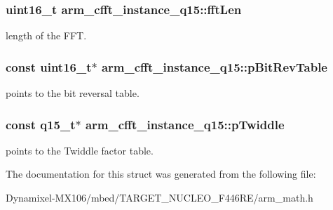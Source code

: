 \subsubsection[{\texorpdfstring{fft\+Len}{fftLen}}]{\setlength{\rightskip}{0pt plus 5cm}uint16\+\_\+t arm\+\_\+cfft\+\_\+instance\+\_\+q15\+::fft\+Len}\hypertarget{structarm__cfft__instance__q15_a5f9e1d3a8c127ee323b5e6929aeb90df}{}\label{structarm__cfft__instance__q15_a5f9e1d3a8c127ee323b5e6929aeb90df}
length of the F\+FT. 
\subsubsection[{\texorpdfstring{p\+Bit\+Rev\+Table}{pBitRevTable}}]{\setlength{\rightskip}{0pt plus 5cm}const uint16\+\_\+t$\ast$ arm\+\_\+cfft\+\_\+instance\+\_\+q15\+::p\+Bit\+Rev\+Table}\hypertarget{structarm__cfft__instance__q15_ac9160b80243b99a0b6e2f75ddb5cf0ae}{}\label{structarm__cfft__instance__q15_ac9160b80243b99a0b6e2f75ddb5cf0ae}
points to the bit reversal table. 
\subsubsection[{\texorpdfstring{p\+Twiddle}{pTwiddle}}]{\setlength{\rightskip}{0pt plus 5cm}const q15\+\_\+t$\ast$ arm\+\_\+cfft\+\_\+instance\+\_\+q15\+::p\+Twiddle}\hypertarget{structarm__cfft__instance__q15_afdaf12ce4687cec021c5ae73d0987a3f}{}\label{structarm__cfft__instance__q15_afdaf12ce4687cec021c5ae73d0987a3f}
points to the Twiddle factor table. 

The documentation for this struct was generated from the following file\+:\begin{DoxyCompactItemize}
\item 
Dynamixel-\/\+M\+X106/mbed/\+T\+A\+R\+G\+E\+T\+\_\+\+N\+U\+C\+L\+E\+O\+\_\+\+F446\+R\+E/arm\+\_\+math.\+h\end{DoxyCompactItemize}
